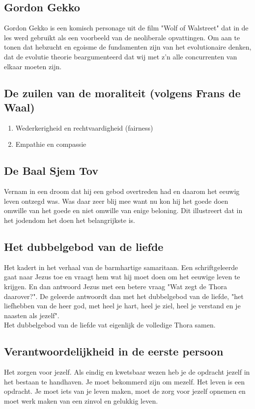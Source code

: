 \documentclass[11pt,a4paper,titlepage]{article}
\begin{document}
\subsection{Gordon Gekko}
Gordon Gekko is een komisch personage uit de film "Wolf of Walstreet" dat in de les werd gebruikt als een voorbeeld van de neoliberale opvattingen. Om aan te tonen dat hebzucht en egoisme de fundamenten zijn van het evolutionaire denken, dat de evolutie theorie beargumenteerd dat wij met z'n alle concurrenten van elkaar moeten zijn.

\subsection{De zuilen van de moraliteit (volgens Frans de Waal)}
\begin{enumerate}
\item Wederkerigheid en rechtvaardigheid (fairness)
\item Empathie en compassie
\end{enumerate}

\subsection{De Baal Sjem Tov}
Vernam in een droom dat hij een gebod overtreden had en daarom het eeuwig leven ontzegd was. Was daar zeer blij mee want nu kon hij het goede doen omwille van het goede en niet omwille van enige beloning. Dit illustreert dat in het jodendom het doen het belangrijkste is.

\subsection{Het dubbelgebod van de liefde}
Het kadert in het verhaal van de barmhartige samaritaan. Een schriftgeleerde gaat naar Jezus toe en vraagt hem wat hij moet doen om het eeuwige leven te krijgen. En dan antwoord Jezus met een betere vraag "Wat zegt de Thora daarover?". De geleerde antwoordt  dan met het dubbelgebod van de liefde, "het liefhebben van de heer god, met heel je hart, heel je ziel, heel je verstand en je naasten als jezelf".\\
Het dubbelgebod van de liefde vat eigenlijk de volledige Thora samen.

\subsection{Verantwoordelijkheid in de eerste persoon}
Het zorgen voor jezelf. Als eindig en kwetsbaar wezen heb je de opdracht jezelf in het bestaan te handhaven. Je moet bekommerd zijn om mezelf. Het leven is een opdracht. Je moet iets van je leven maken, moet de zorg voor jezelf opnemen en moet werk maken van een zinvol en gelukkig leven.
\end{document}
